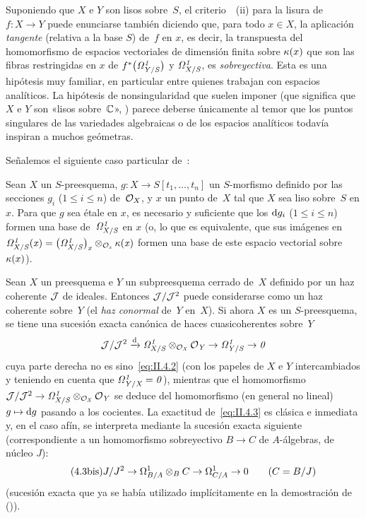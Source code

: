 \begin{remarques}
\label{II.4.7}
Suponiendo que $X$ e $Y$ son lisos sobre~$S$, el criterio~~(ii) para la lisura de $f\colon X\to Y$ puede enunciarse también diciendo que, para todo $x\in X$, la aplicación \emph{tangente} (relativa a la base $S$) de~$f$ en $x$, es decir, la transpuesta del homomorfismo de espacios vectoriales de dimensión finita sobre $\kres(x)$ que son las fibras restringidas en $x$ de $f^*\big(\it{\Omega}^1_{Y/S}\big)$ y $\it{\Omega}^1_{X/S}$, es \emph{sobreyectiva}. Esta es una hipótesis muy familiar, en particular entre quienes trabajan con espacios analíticos. La hipótesis de nonsingularidad que suelen imponer (que significa que $X$ e $Y$ son «lisos sobre~$\CC$», \cf \No{}) parece deberse únicamente al temor que los puntos singulares de las variedades algebraicas o de los espacios analíticos todavía inspiran a muchos geómetras.
\end{remarques}

Señalemos el siguiente caso particular de~:
\begin{corollaire}
\label{II.4.8}
Sean $X$ un $S$-preesquema, $g\colon X\to S[t_1,\dots,t_n]$ un $S$-morfismo definido por las secciones $g_i$ ($1\le i\le n$) de~$\cal{O}_X$, y $x$ un punto de~$X$ tal que $X$ sea liso sobre~$S$ en $x$. Para que $g$ sea étale en $x$, es necesario y suficiente que los $\rd g_i$
($1\le i\le n$) formen una base de~$\it{\Omega}^1_{X/S}$ en $x$ (o, lo que es equivalente, que sus imágenes en
$\it{\Omega}^1_{X/S}(x)=\big(\it{\Omega}^1_{X/S}\big)_x\otimes_{\cal{O}_x}\kres(x)$ formen una base de este espacio vectorial sobre~$\kres(x)$).
\end{corollaire}

Sean $X$ un preesquema e $Y$ un subpreesquema cerrado de~$X$ definido por un haz coherente $\cal{J}$ de ideales. Entonces $\cal{J}/\cal{J}^2$ puede considerarse como un haz coherente sobre~$Y$ (el \emph{haz conormal}
%
%
de~$Y$ en~$X$). Si ahora $X$ es un $S$-preesquema, se tiene una sucesión exacta canónica de haces cuasicoherentes sobre~$Y$
\begin{equation}
\label{eq:II.4.3}
{\cal{J}/\cal{J}^2\lto{\rd}
\it{\Omega}^1_{X/S}\otimes_{\cal{O}_X}\cal{O}_Y\to
\it{\Omega}^1_{Y/S}\to 0}
\end{equation}
cuya parte derecha no es sino~\eqref{eq:II.4.2} (con los papeles de $X$ e $Y$ intercambiados y teniendo en cuenta que $\it{\Omega}^1_{Y/X}=0$), mientras que el homomorfismo $\cal{J}/\cal{J}^2\to\it{\Omega}^1_{X/S}\otimes_{\cal{O}_X}\cal{O}_Y$ se deduce del homomorfismo (en general no lineal) $g\mapsto\rd g$ pasando a los cocientes. La exactitud de~\eqref{eq:II.4.3} es clásica e inmediata y, en el caso afín, se interpreta mediante la sucesión exacta siguiente (correspondiente a un homomorfismo sobreyectivo $B\to C$ de $A$-álgebras, de núcleo $J$):
\begin{equation*}
\label{eq:II.4.3bis}
\tag{4.3\textrm{bis}}
{J/J^2\to\Omega^1_{B/A}\otimes_B C\to\Omega^1_{C/A}\to 0\qquad
(C=B/J)}
\end{equation*}
(sucesión exacta que ya se había utilizado implícitamente en la demostración de ()).
